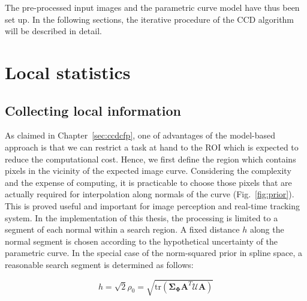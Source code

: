 The pre-processed input images and the parametric curve model have
thus been set up. In the following sections, the iterative procedure of the
CCD algorithm will be described in detail.

\section{Local statistics}
\label{sec:ls}

\subsection{Collecting local information}
\label{sec:cls}

As claimed in Chapter~\ref{sec:ccdcfp}, one of advantages of the
model-based approach is that we can restrict a task at hand to the ROI
which is
expected to reduce the computational cost. Hence, we first define
the region which contains pixels in the vicinity of the expected image
curve. Considering the complexity and the expense of computing, it is practicable
to choose those pixels that are actually required for interpolation along
normals of the curve (Fig.~\ref{fig:prior}). This is proved useful and important for image
perception and real-time tracking system. In the implementation of
this thesis, the processing is limited to a segment of each normal within
a search region. A fixed distance $h$ along the normal segment is
chosen according to the hypothetical uncertainty of the parametric curve. In the
special case of the norm-squared prior in spline space, a reasonable
search segment is determined as follows:

\begin{equation}
  \label{eq:radius}
  h = \sqrt{2} \rho_0 = \sqrt{\mathrm{tr}(\mathbf{\Sigma}_{\mathbf{\Phi}}\mathbf{A}^T\mathcal{U}\mathbf{A})}
\end{equation}

